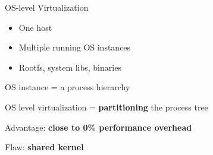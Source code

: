 \begin{frame}{OS-level Virtualization}
	\begin{itemize}
	\item One host
	\item Multiple running OS instances
	\item Rootfs, system libs, binaries
	\end{itemize}
	
	OS instance = a process hierarchy
	
	OS level virtualization = \textbf{partitioning} the process tree
	
	Advantage: \textbf{close to 0\% performance overhead}
	
	Flaw: \textbf{shared kernel}
\end{frame}